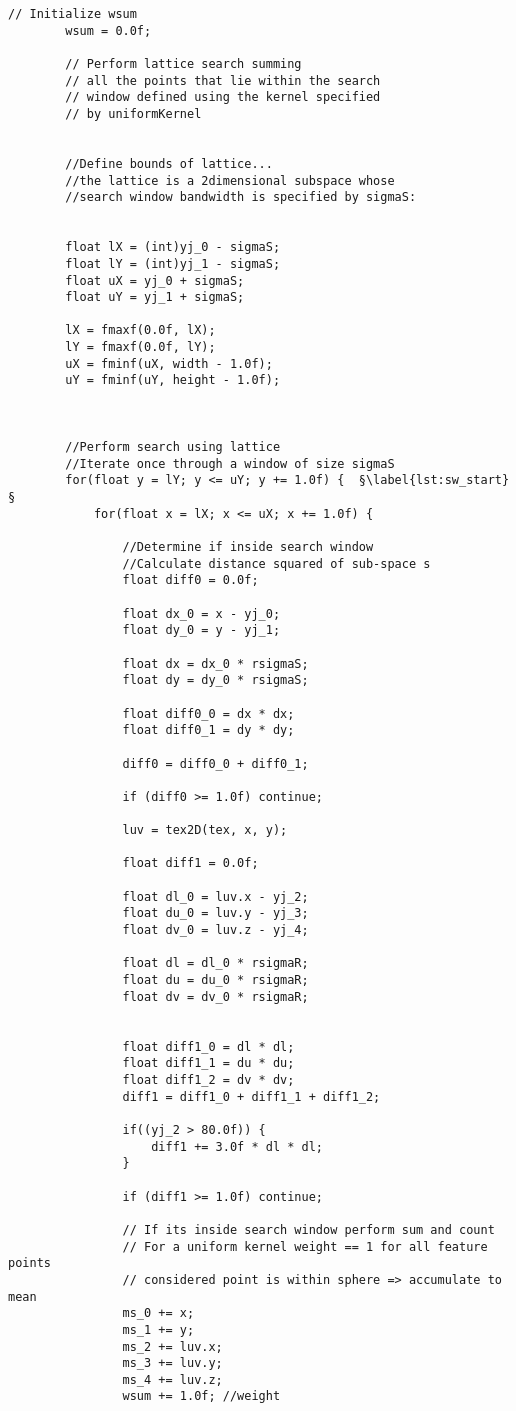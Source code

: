 \begin{lstlisting}[caption=Mean shift kernel, label=lst:msk]
		// Initialize wsum
		wsum = 0.0f;

		// Perform lattice search summing
		// all the points that lie within the search
		// window defined using the kernel specified
		// by uniformKernel


		//Define bounds of lattice...
		//the lattice is a 2dimensional subspace whose
		//search window bandwidth is specified by sigmaS:

		
		float lX = (int)yj_0 - sigmaS;
		float lY = (int)yj_1 - sigmaS;
		float uX = yj_0 + sigmaS;
		float uY = yj_1 + sigmaS;

		lX = fmaxf(0.0f, lX);
		lY = fmaxf(0.0f, lY);
		uX = fminf(uX, width - 1.0f);
		uY = fminf(uY, height - 1.0f);

				
		
		//Perform search using lattice
		//Iterate once through a window of size sigmaS
		for(float y = lY; y <= uY; y += 1.0f) {  §\label{lst:sw_start}§
			for(float x = lX; x <= uX; x += 1.0f) {

				//Determine if inside search window
				//Calculate distance squared of sub-space s	
				float diff0 = 0.0f;

				float dx_0 = x - yj_0;
				float dy_0 = y - yj_1;
				
				float dx = dx_0 * rsigmaS;
				float dy = dy_0 * rsigmaS;

				float diff0_0 = dx * dx;
				float diff0_1 = dy * dy;
				
				diff0 = diff0_0 + diff0_1;

				if (diff0 >= 1.0f) continue;
				
				luv = tex2D(tex, x, y); 
				 
				float diff1 = 0.0f;
	
				float dl_0 = luv.x - yj_2;               
				float du_0 = luv.y - yj_3;               
				float dv_0 = luv.z - yj_4;
				
				float dl = dl_0 * rsigmaR; 
				float du = du_0 * rsigmaR;
				float dv = dv_0 * rsigmaR;
				
					
				float diff1_0 = dl * dl;
				float diff1_1 = du * du;
				float diff1_2 = dv * dv;
				diff1 = diff1_0 + diff1_1 + diff1_2;
			
				if((yj_2 > 80.0f)) { 
					diff1 += 3.0f * dl * dl;
				}
			
				if (diff1 >= 1.0f) continue;

				// If its inside search window perform sum and count
				// For a uniform kernel weight == 1 for all feature points
				// considered point is within sphere => accumulate to mean
				ms_0 += x;
				ms_1 += y;
				ms_2 += luv.x;
				ms_3 += luv.y;
				ms_4 += luv.z;
				wsum += 1.0f; //weight


\end{lstlisting}
